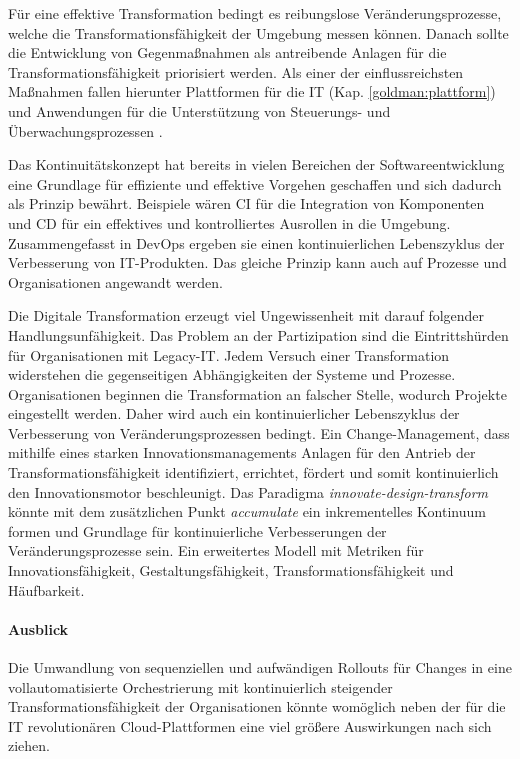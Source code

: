 Für eine effektive Transformation bedingt es reibungslose Veränderungsprozesse, welche die Transformationsfähigkeit der Umgebung messen können. Danach sollte die Entwicklung von Gegenmaßnahmen als antreibende Anlagen für die Transformationsfähigkeit priorisiert werden. Als einer der einflussreichsten Maßnahmen fallen hierunter Plattformen für die IT (Kap. \ref{goldman:plattform}) und Anwendungen für die Unterstützung von Steuerungs- und Überwachungsprozessen \cite{Bussmann2006}.

Das Kontinuitätskonzept hat bereits in vielen Bereichen der Softwareentwicklung eine Grundlage für effiziente und effektive Vorgehen geschaffen und sich dadurch als Prinzip bewährt. Beispiele wären \ac{CI} für die Integration von Komponenten und \ac{CD} für ein effektives und kontrolliertes Ausrollen in die Umgebung. Zusammengefasst in DevOps ergeben sie einen kontinuierlichen Lebenszyklus der Verbesserung von IT-Produkten. Das gleiche Prinzip kann auch auf Prozesse und Organisationen angewandt werden.

Die Digitale Transformation erzeugt viel Ungewissenheit mit darauf folgender Handlungsunfähigkeit. Das Problem an der Partizipation sind die Eintrittshürden für Organisationen mit Legacy-IT. Jedem Versuch einer Transformation widerstehen die gegenseitigen Abhängigkeiten der Systeme und Prozesse. Organisationen beginnen die Transformation an falscher Stelle, wodurch Projekte eingestellt werden. Daher wird auch ein kontinuierlicher Lebenszyklus der Verbesserung von Veränderungsprozessen bedingt. Ein Change-Management, dass mithilfe eines starken Innovationsmanagements Anlagen für den Antrieb der Transformationsfähigkeit identifiziert, errichtet, fördert und somit kontinuierlich den Innovationsmotor beschleunigt.
Das Paradigma \emph{innovate-design-transform} \cite{Koch2016} könnte mit dem zusätzlichen Punkt \emph{accumulate} ein inkrementelles Kontinuum formen und Grundlage für kontinuierliche Verbesserungen der Veränderungsprozesse sein. Ein erweitertes Modell mit Metriken für Innovationsfähigkeit, Gestaltungsfähigkeit, Transformationsfähigkeit und Häufbarkeit.

\paragraph{Ausblick}

Die Umwandlung von sequenziellen und aufwändigen Rollouts für Changes in eine vollautomatisierte Orchestrierung mit kontinuierlich steigender Transformationsfähigkeit der Organisationen könnte womöglich neben der für die IT revolutionären Cloud-Plattformen eine viel größere Auswirkungen nach sich ziehen. 

